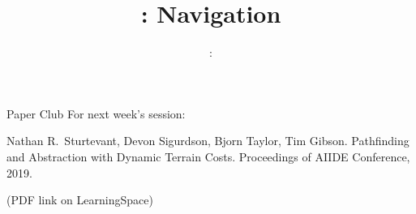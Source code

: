 \usepackage{../../beamerthemeFalmouthGamesAcademy}
\usepackage{multimedia}
\graphicspath{ {../../} }


\usepackage[normalem]{ulem}
\usepackage{wasysym}

\usepackage{pdfpages}

\usetikzlibrary{arrows,automata}




\title{\sessionnumber: Navigation}
\subtitle{\modulecode: \moduletitle}

\frame{\titlepage} 

\begin{frame}{Paper Club}
	For next week's session:
	
	Nathan R.\ Sturtevant, Devon Sigurdson, Bjorn Taylor, Tim Gibson.
	Pathfinding and Abstraction with Dynamic Terrain Costs.
	Proceedings of AIIDE Conference, 2019.
	
	(PDF link on LearningSpace)
\end{frame}





